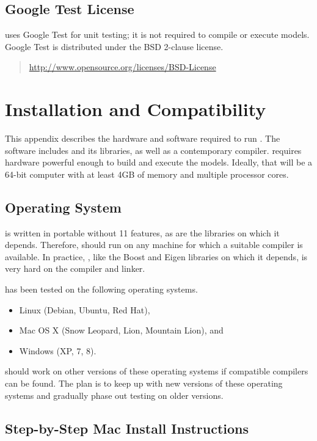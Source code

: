 \section{Google Test License}

\Stan uses Google Test for unit testing; it is not required to compile
or execute models.  Google Test is distributed under the BSD 2-clause
license.
%
\begin{quote}
\url{http://www.opensource.org/licenses/BSD-License}
\end{quote}


\chapter{Installation and Compatibility}\label{install.appendix}

\noindent
This appendix describes the hardware and software required to run
\Stan.  The software includes \Stan and its libraries, as well as a
contemporary \Cpp compiler.  \Stan requires hardware powerful enough
to build and execute the models.  Ideally, that will be a 64-bit
computer with at least 4GB of memory and multiple processor cores.

\section{Operating System}

\Stan is written in portable \Cpp without {\Cpp}11 features, as are the
libraries on which it depends.  Therefore, \Stan should run on any machine
for which a suitable \Cpp compiler is available.  In practice, \Stan,
like the Boost and Eigen libraries on which it depends, is very hard
on the compiler and linker.

\Stan has been tested on the following operating systems.
%
\begin{itemize}
\item Linux (Debian, Ubuntu, Red Hat), 
\item Mac OS X (Snow Leopard, Lion, Mountain Lion), and
\item Windows (XP, 7, 8).
\end{itemize}
%
\Stan should work on other versions of these operating systems if
compatible \Cpp compilers can be found.  The plan is to keep up with
new versions of these operating systems and gradually phase out
testing on older versions.


\section{Step-by-Step Mac Install Instructions}

